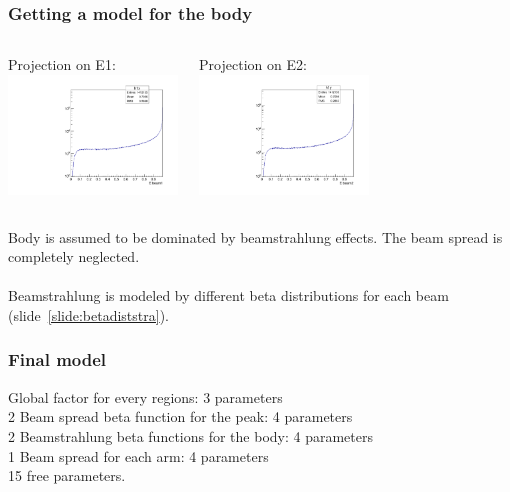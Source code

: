 \documentclass{beamer}
\begin{document}
\begin{frame}
\frametitle{Getting a model for the body}
\begin{columns}[c]
\column{6cm}
\begin{center}
Projection on E1:\\
\includegraphics[width=4.5cm]{Body_projX.pdf}
\end{center}
\column{6cm}
\begin{center}
Projection on E2:\\
\includegraphics[width=4.5cm]{Body_projY.pdf}
\end{center}
\end{columns}
Body is assumed to be dominated by beamstrahlung effects. The beam spread is
completely neglected.\\
~\\
Beamstrahlung is modeled by different beta distributions
for each beam (slide~\ref{slide:betadiststra}).
\end{frame}

\begin{frame}
\frametitle{Final model}
Global factor for every regions: 3 parameters\\
2 Beam spread beta function for the peak: 4 parameters\\
2 Beamstrahlung beta functions for the body: 4 parameters\\
1 Beam spread for each arm: 4 parameters\\
\alert{15 free parameters}.
\end{frame}
\end{document}
